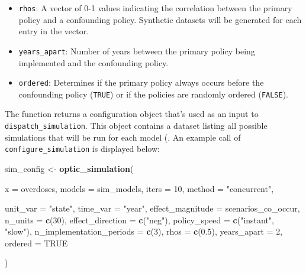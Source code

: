 \documentclass[
]{article}
\newenvironment{Shaded}{\begin{snugshade}}{\end{snugshade}}
\newcommand{\DataTypeTok}[1]{\textcolor[rgb]{0.13,0.29,0.53}{#1}}
\newcommand{\DecValTok}[1]{\textcolor[rgb]{0.00,0.00,0.81}{#1}}
\newcommand{\FloatTok}[1]{\textcolor[rgb]{0.00,0.00,0.81}{#1}}
\newcommand{\KeywordTok}[1]{\textcolor[rgb]{0.13,0.29,0.53}{\textbf{#1}}}
\newcommand{\NormalTok}[1]{#1}
\newcommand{\OtherTok}[1]{\textcolor[rgb]{0.56,0.35,0.01}{#1}}
\newcommand{\StringTok}[1]{\textcolor[rgb]{0.31,0.60,0.02}{#1}}
\begin{document}
\begin{itemize}
\item
  \texttt{rhos}: A vector of 0-1 values indicating the correlation
  between the primary policy and a confounding policy. Synthetic
  datasets will be generated for each entry in the vector.
\item
  \texttt{years\_apart}: Number of years between the primary policy
  being implemented and the confounding policy.
\item
  \texttt{ordered}: Determines if the primary policy always occurs
  before the confounding policy (\texttt{TRUE}) or if the policies are
  randomly ordered (\texttt{FALSE}).
\end{itemize}

The function returns a configuration object that's used as an input to
\texttt{dispatch\_simulation}. This object contains a dataset listing
all possible simulations that will be run for each model (. An example
call of \texttt{configure\_simulation} is displayed below:

\begin{Shaded}
\begin{Highlighting}[]
\NormalTok{sim\_config \textless{}{-}}\StringTok{ }\KeywordTok{optic\_simulation}\NormalTok{(}
  
  \DataTypeTok{x      =}\NormalTok{ overdoses,}
  \DataTypeTok{models =}\NormalTok{ sim\_models,}
  \DataTypeTok{iters  =} \DecValTok{10}\NormalTok{,}
  \DataTypeTok{method =} \StringTok{"concurrent"}\NormalTok{,}

  \DataTypeTok{unit\_var                 =} \StringTok{"state"}\NormalTok{,}
  \DataTypeTok{time\_var                 =} \StringTok{"year"}\NormalTok{,}
  \DataTypeTok{effect\_magnitude         =}\NormalTok{ scenarios\_co\_occur,}
  \DataTypeTok{n\_units                  =} \KeywordTok{c}\NormalTok{(}\DecValTok{30}\NormalTok{),}
  \DataTypeTok{effect\_direction         =} \KeywordTok{c}\NormalTok{(}\StringTok{"neg"}\NormalTok{),}
  \DataTypeTok{policy\_speed             =} \KeywordTok{c}\NormalTok{(}\StringTok{"instant"}\NormalTok{, }\StringTok{"slow"}\NormalTok{),}
  \DataTypeTok{n\_implementation\_periods =} \KeywordTok{c}\NormalTok{(}\DecValTok{3}\NormalTok{),}
  \DataTypeTok{rhos                     =} \KeywordTok{c}\NormalTok{(}\FloatTok{0.5}\NormalTok{),}
  \DataTypeTok{years\_apart              =} \DecValTok{2}\NormalTok{,}
  \DataTypeTok{ordered                  =} \OtherTok{TRUE}

\NormalTok{)}
\end{Highlighting}
\end{Shaded}
\end{document}
